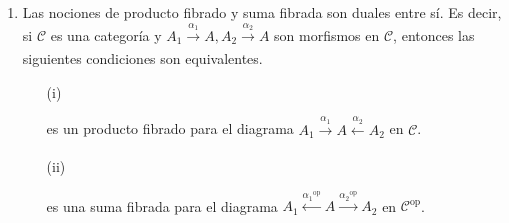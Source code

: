 \documentclass[tesis]{subfiles}
\begin{document}
\begin{Obs}
\begin{enumerate}[label=(\arabic*)]
    \item Las nociones de producto fibrado y suma fibrada son duales entre sí. Es decir, si $\mathscr{C}$ es una categoría y $A_1\xrightarrow[]{\alpha_1}A, A_2\xrightarrow[]{\alpha_2}A$ son morfismos en $\mathscr{C}$, entonces las siguientes condiciones son equivalentes.
        \begin{itemize}
           \item[(i)] 
           es un producto fibrado para el diagrama $A_1\xrightarrow[]{\alpha_1}A\xleftarrow[]{\alpha_2}A_2$ en $\mathscr{C}$.
           \item[(ii)] 
           es una suma fibrada para el diagrama $A_1\xleftarrow[]{\alpha_1{}^\text{op}}A\xrightarrow[]{\alpha_2{}^\text{op}}A_2$ en $\mathscr{C}^\text{op}$.
        \end{itemize}
    \end{enumerate}
\end{Obs}
\end{document}
